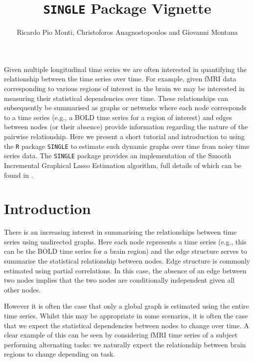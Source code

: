 \documentclass[letterpaper,11pt]{article}
\begin{document}


\title{{\tt SINGLE} Package Vignette}
\author{Ricardo Pio Monti, Christoforos Anagnostopoulos and Giovanni Montana}
\maketitle

Given multiple longitudinal time series we are often interested in quantifying the relationship between the time series over time. For example, given fMRI data corresponding to various regions of interest in the brain we may be interested in measuring their statistical dependencies over time. These relationships can subsequently be summarised as graphs or networks where each node corresponds to a time series (e.g., a BOLD time series for a region of interest) and edges between nodes (or their absence) provide information regarding the nature of the pairwise relationship. Here we present a short tutorial and introduction to using the \verb+R+ package \verb+SINGLE+ to estimate such dynamic graphs over time from noisy time series data. The \verb+SINGLE+ package provides an implementation of the Smooth Incremental Graphical Lasso Estimation algorithm, full details of which can be found in \citep{MYREF}.

\newpage
\section{Introduction}

There is an increasing interest in summarising the relationships between time series using undirected graphs.  Here each node represents a time series (e.g., this can be the BOLD time series for a brain region) and the edge structure serves to summarise the statistical relationship between nodes. Edge structure is commonly estimated using partial correlations. In this case, the absence of an edge between two nodes implies that the two nodes are conditionally independent given all other nodes. 

However it is often the case that only a global graph is estimated using the entire time series. Whilst this may be appropriate in some scenarios, it is often the case that we expect the statistical dependencies between nodes to change over time. A clear example of this can be seen by considering fMRI time series of a subject performing alternating tasks: we naturally expect the relationship between brain regions to change depending on task.
\end{document}
